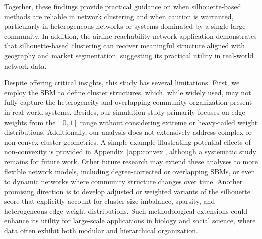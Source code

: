 \documentclass[12pt, titlepage, reqno]{article}
\begin{document}
Together, these findings provide practical guidance on when 
silhouette-based methods are reliable in network clustering and when 
caution is warranted, particularly in heterogeneous networks or 
systems dominated by a single large community. In addition, the 
airline reachability network application demonstrates that 
silhouette-based clustering can recover meaningful structure aligned 
with geography and market segmentation, suggesting its practical 
utility in real-world network data.


Despite offering critical insights, this study has several 
limitations. First, we employ the SBM to define cluster structures, 
which, while widely used, may not fully 
capture the heterogeneity and overlapping community organization 
present in real-world systems. Besides, our simulation study primarily
focuses on edge weights from the $[0,1]$ range without considering 
extreme or heavy-tailed weight distributions. Additionally, our 
analysis does not extensively address complex or non-convex cluster 
geometries. A simple example illustrating potential effects of 
non-convexity is provided in Appendix~\ref{app:convex}, although a 
systematic study remains for future work. Other future research may 
extend these analyses to more flexible 
network models, including degree-corrected or overlapping SBMs, or 
even to dynamic networks where community structure changes over 
time. Another promising direction is to develop adjusted or weighted 
variants of the silhouette score that explicitly account for cluster 
size imbalance, sparsity, and heterogeneous edge-weight 
distributions. Such methodological extensions could enhance its 
utility for large-scale applications in biology and social science, 
where data often exhibit both modular and hierarchical organization.






\end{document}

